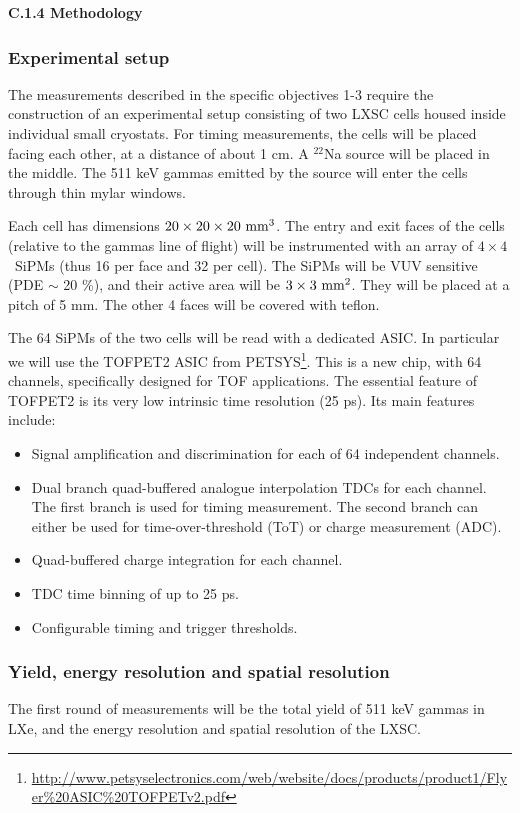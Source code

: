 
\noindent\textbf{C.1.4 Methodology}

\subsubsection*{Experimental setup}
The measurements described in the specific objectives 1-3 require the construction of an experimental setup consisting of two LXSC cells housed inside individual small cryostats. For timing measurements, the cells will be placed facing each other, at a distance of about 1 cm. A \ensuremath{^{22}}Na source will be placed in the middle. The 511 keV gammas emitted by the source will enter the cells through thin mylar windows. 

Each cell has dimensions $20 \times 20 \times 20 {\rm ~mm^3}$. The entry and exit faces of the cells (relative to the gammas line of flight) will be instrumented with an array of $4 \times 4$~SiPMs (thus 16 per face and 32 per cell). The SiPMs will be VUV sensitive (PDE $\sim$ 20 \%), and their active area will be $3 \times 3{\rm ~mm^2}$. They will be placed at a pitch of 5 mm. The other 4 faces will be covered with teflon.

The 64 SiPMs of the two cells will be read with a dedicated ASIC. In particular we will use the 
TOFPET2 ASIC from PETSYS\footnote{\url{http://www.petsyselectronics.com/web/website/docs/products/product1/Flyer\%20ASIC\%20TOFPETv2.pdf}}. This is a  new chip, with 64 channels, specifically designed for TOF applications. The essential feature of TOFPET2 is its very low intrinsic time resolution (25 ps).  Its main features include:

\begin{itemize}
\item Signal amplification and discrimination for each of 64 independent channels. 
\item Dual branch quad-buffered analogue interpolation TDCs for each channel. The first
branch is used for timing measurement. The second branch can either be used for
time-over-threshold (ToT) or charge measurement (ADC).
\item Quad-buffered charge integration for each channel.
\item TDC time binning of up to 25 ps. 
\item  Configurable timing and trigger thresholds.
\end{itemize}

\subsubsection*{Yield, energy resolution and spatial resolution}
The first round of measurements will be the total yield of 511 keV gammas in LXe, and the energy resolution and spatial resolution of the LXSC. 

